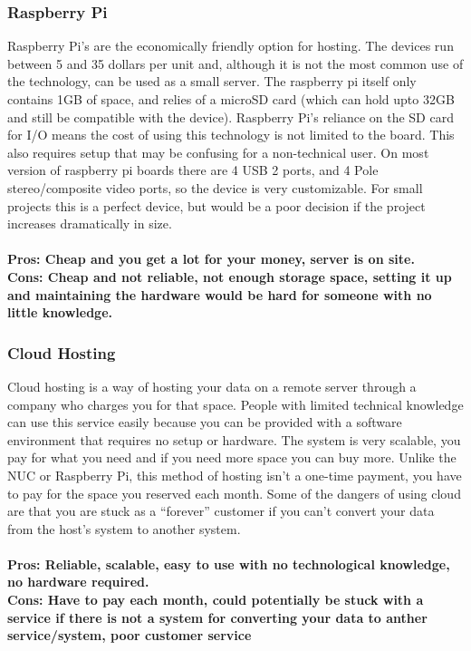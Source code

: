 \documentclass[draftclsnofoot,onecolumn,letterpaper,10pt,compsoc]{IEEEtran}
\begin{document}
  			\subsubsection{Raspberry Pi}
					Raspberry Pi's are the economically friendly option for hosting.
					The devices run between 5 and 35 dollars per unit and, although it is not the most common use of the technology, can be used as a small server\cite{CopaHost}.
					The raspberry pi itself only contains 1GB of space, and relies of a microSD card (which can hold upto 32GB and still be compatible with the device)\cite{CopaHost}.
					Raspberry Pi’s reliance on the SD card for I/O means the cost of using this technology is not limited to the board.
					This also requires setup that may be confusing for a non-technical user.
					On most version of raspberry pi boards there are 4 USB 2 ports, and 4 Pole stereo/composite video ports\cite{RaspberryPi}, so the device is very customizable.
					For small projects this is a perfect device, but would be a poor decision if the project increases dramatically in size.
					\\\\
					\textbf{Pros: Cheap and you get a lot for your money, server is on site.}
					\\
					\textbf{Cons: Cheap and not reliable, not enough storage space, setting it up and maintaining the hardware would be hard for someone with no little knowledge.}

  			\subsubsection{Cloud Hosting}
		        Cloud hosting is a way of hosting your data on a remote server through a company who charges you for that space.
						People with limited technical knowledge can use this service easily because you can be provided with a software environment that requires no setup or hardware\cite{InterRoute}.
						The system is very scalable, you pay for what you need and if you need more space you can buy more\cite{InterRoute}.
						Unlike the NUC or Raspberry Pi, this method of hosting isn't a one-time payment, you have to pay for the space you reserved each month\cite{TheBalance}.
						Some of the dangers of using cloud are that you are stuck as a “forever” customer if you can't convert your data from the host's system to another system\cite{TheBalance}.
						\\ \\
						\textbf{Pros: Reliable, scalable, easy to use with no technological knowledge, no hardware required.}
						\\
						\textbf{Cons: Have to pay each month, could potentially be stuck with a service if there is not a system for converting your data to anther service/system, poor customer service}
\end{document}

